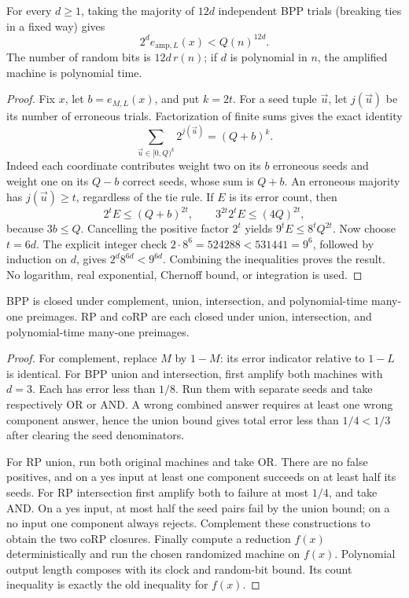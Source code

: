 \begin{theorem}\label{thm:R03}
For every $d\geq1$, taking the majority of $12d$ independent BPP trials
(breaking ties in a fixed way) gives
\[
 2^d e_{\mathrm{amp},L}(x)<Q(n)^{12d}.
\]
The number of random bits is $12d\,r(n)$; if $d$ is polynomial in $n$,
the amplified machine is polynomial time.
\end{theorem}
\begin{proof}
Fix $x$, let $b=e_{M,L}(x)$, and put $k=2t$. For a seed tuple $\vec u$,
let $j(\vec u)$ be its number of erroneous trials. Factorization of finite
sums gives the exact identity
\[
 \sum_{\vec u\in[0,Q)^k}2^{j(\vec u)}=(Q+b)^k.
\]
Indeed each coordinate contributes weight two on its $b$ erroneous seeds
and weight one on its $Q-b$ correct seeds, whose sum is $Q+b$.
An erroneous majority has $j(\vec u)\geq t$, regardless of the tie rule.
If $E$ is its error count, then
\[
 2^tE\leq(Q+b)^{2t},\qquad
 3^{2t}2^tE\leq(4Q)^{2t},
\]
because $3b\leq Q$. Cancelling the positive factor $2^t$ yields
$9^tE\leq8^tQ^{2t}$. Now choose $t=6d$. The explicit integer check
$2\cdot8^6=524288<531441=9^6$, followed by induction on $d$, gives
$2^d8^{6d}<9^{6d}$. Combining the inequalities proves the result.
No logarithm, real exponential, Chernoff bound, or integration is used.
\end{proof}

\begin{theorem}\label{thm:R04}
BPP is closed under complement, union, intersection, and polynomial-time
many-one preimages. RP and coRP are each closed under union, intersection,
and polynomial-time many-one preimages.
\end{theorem}
\begin{proof}
For complement, replace $M$ by $1-M$: its error indicator relative to
$1-L$ is identical. For BPP union and intersection, first amplify both
machines with $d=3$. Each has error less than $1/8$. Run them with separate
seeds and take respectively OR or AND. A wrong combined answer requires
at least one wrong component answer, hence the union bound gives total
error less than $1/4<1/3$ after clearing the seed denominators.

For RP union, run both original machines and take OR. There are no false
positives, and on a yes input at least one component succeeds on at least
half its seeds. For RP intersection first amplify both to failure at most
$1/4$, and take AND. On a yes input, at most half the seed pairs fail by
the union bound; on a no input one component always rejects. Complement
these constructions to obtain the two coRP closures. Finally compute a
reduction $f(x)$ deterministically and run the chosen randomized machine
on $f(x)$. Polynomial output length composes with its clock and random-bit
bound. Its count inequality is exactly the old inequality for $f(x)$.
\end{proof}

